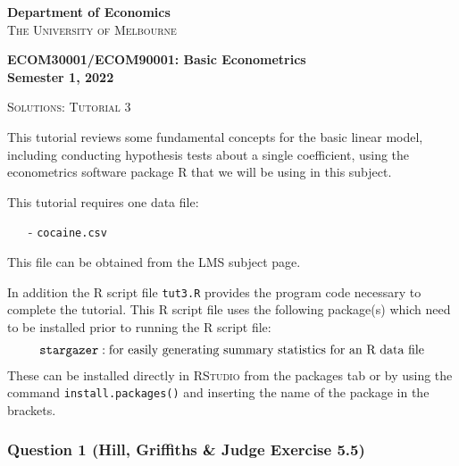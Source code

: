 \documentclass[12pt,a4paper]{article}
\begin{document}
\thispagestyle{plain}
\begin{center}
\textbf{Department of Economics} \\
\textsc{The University of Melbourne}
\end{center}
\vspace{0.1in}
\begin{center}
\textbf{ECOM30001/ECOM90001: Basic Econometrics} \\
\textbf{Semester 1, 2022}
\end{center}
\vspace{0.1in}
\begin{center}
\textsc{Solutions: Tutorial 3}
\end{center}
\noindent \hrulefill


\noindent This tutorial reviews some fundamental concepts for the basic linear model, including conducting hypothesis tests about a single coefficient, using the econometrics
software package \textsc{R} that we will be using in this
subject. \vspace{0.1in}

\noindent This tutorial requires one data file:
\begin{itemize}
\item[-] \texttt{cocaine.csv}
\end{itemize}
This file can be obtained from the LMS subject page.  \vspace{0.1in}

\noindent In addition the R script file \texttt{tut3.R} provides the program code necessary to complete the tutorial. This R script file uses the following package(s) which need to be installed prior to running the R script file:
\begin{align*}
\mbox{\texttt{stargazer}} & : \mbox{for easily generating summary statistics for an R data file} \\
\end{align*}
These can be installed directly in \textsc{RStudio} from the packages tab or by using the command \texttt{install.packages()} and inserting the name of the package in the brackets.

 \newpage

\subsubsection*{Question 1 (Hill, Griffiths \& Judge Exercise 5.5)}
\renewcommand{\labelenumi}{\alph{enumi})}
\renewcommand{\labelenumii}{\roman{enumii})}
\end{document}
